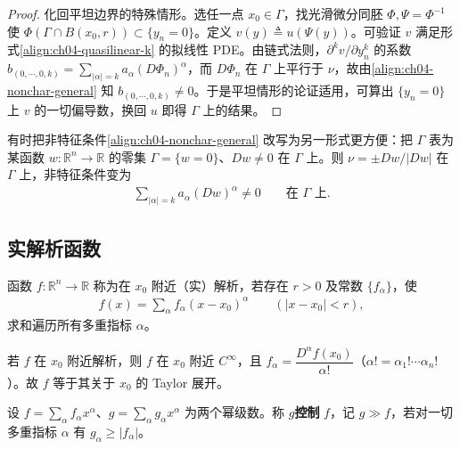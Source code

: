 \documentclass[../../main.tex]{subfiles}
\begin{document}
\begin{proof}
化回平坦边界的特殊情形。选任一点 $x_0\in\Gamma$，找光滑微分同胚 $\Phi,\Psi=\Phi^{-1}$ 使 $\Phi(\Gamma\cap B(x_0,r))\subset\{y_n=0\}$。定义 $v(y)\triangleq u(\Psi(y))$。可验证 $v$ 满足形式\eqref{align:ch04-quasilinear-k} 的拟线性 PDE。由链式法则，$\partial^k v/\partial y_n^k$ 的系数 $b_{(0,\cdots,0,k)}=\sum_{|\alpha|=k}a_\alpha(D\Phi_n)^\alpha$，而 $D\Phi_n$ 在 $\Gamma$ 上平行于 $\nu$，故由\eqref{align:ch04-nonchar-general} 知 $b_{(0,\cdots,0,k)}\neq 0$。于是平坦情形的论证适用，可算出 $\{y_n=0\}$ 上 $v$ 的一切偏导数，换回 $u$ 即得 $\Gamma$ 上的结果。
\end{proof}

\begin{remark}\label{remark:ch04-nonchar}
有时把非特征条件\eqref{align:ch04-nonchar-general} 改写为另一形式更方便：把 $\Gamma$ 表为某函数 $w:\mathbb{R}^n\to\mathbb{R}$ 的零集 $\Gamma=\{w=0\}$、$Dw\neq 0$ 在 $\Gamma$ 上。则 $\nu=\pm Dw/|Dw|$ 在 $\Gamma$ 上，非特征条件变为
\begin{align}\label{align:ch04-nonchar-w}
\sum_{|\alpha|=k}a_\alpha(Dw)^\alpha\neq 0 \qquad\text{在 }\Gamma\text{ 上}.
\end{align}
\end{remark}

\subsection{实解析函数}\label{subsection:ch04-analytic}

\begin{definition}\label{definition:ch04-analytic}
函数 $f:\mathbb{R}^n\to\mathbb{R}$ 称为在 $x_0$ 附近（实）解析，若存在 $r>0$ 及常数 $\{f_\alpha\}$，使
\begin{align}\label{align:ch04-analytic-def}
f(x)=\sum_\alpha f_\alpha(x-x_0)^\alpha \qquad(|x-x_0|<r),
\end{align}
求和遍历所有多重指标 $\alpha$。
\end{definition}

若 $f$ 在 $x_0$ 附近解析，则 $f$ 在 $x_0$ 附近 $C^\infty$，且 $f_\alpha=\dfrac{D^\alpha f(x_0)}{\alpha!}$（$\alpha!=\alpha_1!\cdots\alpha_n!$）。故 $f$ 等于其关于 $x_0$ 的 Taylor 展开。

\begin{definition}\label{definition:ch04-majorant}
设 $f=\sum_\alpha f_\alpha x^\alpha$、$g=\sum_\alpha g_\alpha x^\alpha$ 为两个幂级数。称 $g$\textbf{控制} $f$，记 $g\gg f$，若对一切多重指标 $\alpha$ 有 $g_\alpha\geqslant|f_\alpha|$。
\end{definition}
\end{document}
